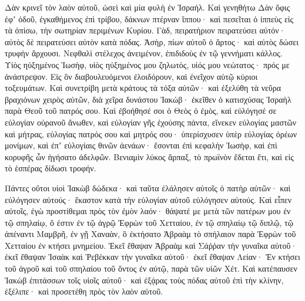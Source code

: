 {Δὰν κρινεῖ τὸν λαὸν αὐτοῦ, ὡσεὶ καὶ μία φυλὴ ἐν Ἰσραήλ.
Καὶ γενηθήτω Δὰν ὄφις ἐφʼ ὁδοῦ, ἐγκαθήμενος ἐπὶ τρίβου, δάκνων πτέρναν ἵππου· καὶ πεσεῖται ὁ ἱππεὺς εἰς τὰ ὀπίσω,
τὴν σωτηρίαν περιμένων Κυρίου.
Γὰδ, πειρατήριον πειρατεύσει αὐτόν· αὐτὸς δὲ πειρατεύσει αὐτὸν κατὰ πόδας.
Ἀσὴρ, πίων αὐτοῦ ὁ ἄρτος· καὶ αὐτὸς δώσει τρυφὴν ἄρχουσι.
Νεφθαλὶ στέλεχος ἀνειμένον, ἐπιδιδοὺς ἐν τῷ γεννήματι κάλλος.
Υἱὸς ηὐξημένος Ἰωσὴφ, υἱὸς ηὐξημένος μου ζηλωτὸς, υἱός μου νεώτατος· πρός με ἀνάστρεψον.
Εἰς ὃν διαβουλευόμενοι ἐλοιδόρουν, καὶ ἐνεῖχον αὐτῷ κύριοι τοξευμάτων.
Καὶ συνετρίβη μετὰ κράτους τὰ τόξα αὐτῶν· καὶ ἐξελύθη τὰ νεῦρα βραχιόνων χειρὸς αὐτῶν, διὰ χεῖρα δυνάστου Ἰακώβ· ἐκεῖθεν ὁ κατισχύσας Ἰσραὴλ παρὰ Θεοῦ τοῦ πατρός σου.
Καὶ ἐβοήθησέ σοι ὁ Θεὸς ὁ ἐμὸς, καὶ εὐλόγησέ σε εὐλογίαν οὐρανοῦ ἄνωθεν, καὶ εὐλογίαν γῆς ἐχούσης πάντα, εἵνεκεν εὐλογίας μαστῶν καὶ μήτρας,
εὐλογίας πατρός σου καὶ μητρός σου· ὑπερίσχυσεν ὑπὲρ εὐλογίας ὀρέων μονίμων, καὶ ἐπʼ εὐλογίαις θινῶν ἀενάων· ἔσονται ἐπὶ κεφαλὴν Ἰωσὴφ, καὶ ἐπὶ κορυφῆς ὧν ἡγήσατο ἀδελφῶν.
Βενιαμὶν λύκος ἅρπαξ, τὸ πρωϊνὸν ἔδεται ἔτι, καὶ εἰς τὸ ἑσπέρας δίδωσι τροφήν.
\par }{\MM {}Πάντες οὕτοι υἱοὶ Ἰακὼβ δώδεκα· καὶ ταῦτα ἐλάλησεν αὐτοῖς ὁ πατὴρ αὐτῶν· καὶ εὐλόγησεν αὐτούς· ἕκαστον κατὰ τὴν εὐλογίαν αὐτοῦ εὐλόγησεν αὐτούς.
Καὶ εἶπεν αὐτοῖς, ἐγὼ προστίθεμαι πρὸς τὸν ἐμὸν λαόν· θάψατέ με μετὰ τῶν πατέρων μου ἐν τῷ σπηλαίῳ, ὅ ἐστιν ἐν τῷ ἀγρῷ Ἐφρὼν τοῦ Χετταίου,
ἐν τῷ σπηλαίῳ τῷ διπλῷ, τῷ ἀπέναντι Μαμβρῆ, ἐν γῇ Χαναὰν, ὃ ἐκτήσατο Ἁβραὰμ τὸ σπήλαιον παρὰ Ἐφρὼν τοῦ Χετταίου ἐν κτήσει μνημείου.
Ἐκεῖ ἔθαψαν Ἁβραὰμ καὶ Σάῤῥαν τὴν γυναῖκα αὐτοῦ· ἐκεῖ ἔθαψαν Ἰσαὰκ καὶ Ῥεβέκκαν τὴν γυναῖκα αὐτοῦ· ἐκεῖ ἔθαψαν Λείαν·
Ἐν κτήσει τοῦ ἀγροῦ καὶ τοῦ σπηλαίου τοῦ ὄντος ἐν αὐτῷ, παρὰ τῶν υἱῶν Χέτ.
Καὶ κατέπαυσεν Ἰακὼβ ἐπιτάσσων τοῖς υἱοῖς αὐτοῦ· καὶ ἐξᾴρας τοὺς πόδας αὐτοῦ ἐπὶ τὴν κλίνην, ἐξέλιπε· καὶ προσετέθη πρὸς τὸν λαὸν αὐτοῦ.

}
